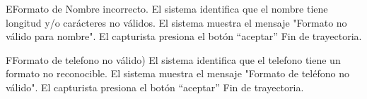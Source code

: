 \begin{UCtrayectoriaA}{E}{Formato de Nombre incorrecto.}
	\UCpaso El sistema identifica que el nombre tiene longitud y/o carácteres no válidos.
	\UCpaso El sistema muestra el mensaje "Formato no válido para nombre".
	\UCpaso El capturista presiona el botón “aceptar”
	\UCpaso Fin de trayectoria.
\end{UCtrayectoriaA}

\begin{UCtrayectoriaA}{F}{Formato de telefono no válido)}
	\UCpaso El sistema identifica que el telefono tiene un formato no reconocible.
	\UCpaso El sistema muestra el mensaje "Formato de teléfono no válido".
	\UCpaso El capturista presiona el botón “aceptar”
	\UCpaso Fin de trayectoria.
\end{UCtrayectoriaA}

		
